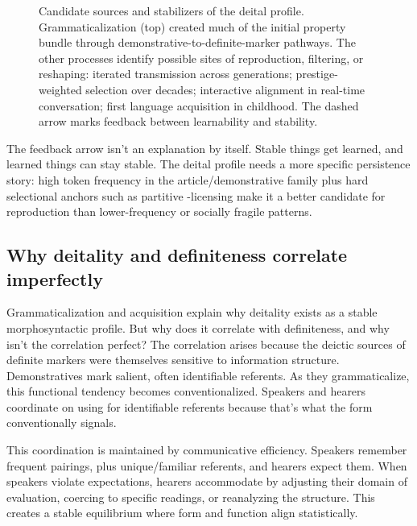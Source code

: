 \documentclass[12pt,letterpaper]{article}
\begin{document}
\begin{figure}[htbp]
\caption{Candidate sources and stabilizers of the deital profile. Grammaticalization (top) created much of the initial property bundle through demonstrative-to-definite-marker pathways. The other processes identify possible sites of reproduction, filtering, or reshaping: iterated transmission across generations; prestige-weighted selection over decades; interactive alignment in real-time conversation; first language acquisition in childhood. The dashed arrow marks feedback between learnability and stability.}
\label{fig:deital-maintainers}
\end{figure}

The feedback arrow isn't an explanation by itself. Stable things get learned, and learned things can stay stable. The deital profile needs a more specific persistence story: high token frequency in the article/demonstrative family plus hard selectional anchors such as partitive -licensing make it a better candidate for reproduction than lower-frequency or socially fragile patterns.

\subsection{Why deitality and definiteness correlate imperfectly}\label{subsec:autonomy}

Grammaticalization and acquisition explain why deitality exists as a stable morphosyntactic profile. But why does it correlate with definiteness, and why isn't the correlation perfect? The correlation arises because the deictic sources of definite markers were themselves sensitive to information structure. Demonstratives mark salient, often identifiable referents. As they grammaticalize, this functional tendency becomes conventionalized. Speakers and hearers coordinate on using  for identifiable referents because that's what the form conventionally signals.

This coordination is maintained by communicative efficiency. Speakers remember frequent pairings,  plus unique/familiar referents, and hearers expect them. When speakers violate expectations, hearers accommodate by adjusting their domain of evaluation, coercing to specific readings, or reanalyzing the structure. This creates a stable equilibrium where form and function align statistically.
\end{document}
